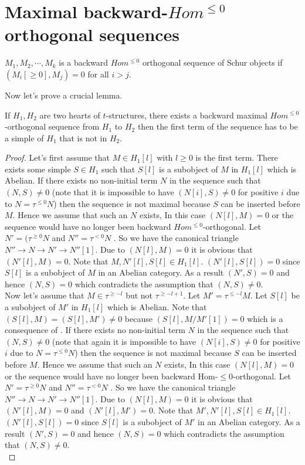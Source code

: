\section{Maximal backward-$Hom^{\leq 0}$ orthogonal sequences}
\begin{definition}
$M_1,M_2,\cdots, M_k$ is a backward $Hom^{\leq 0}$ orthogonal sequence of Schur objects if $(M_i[\geq 0], M_j) = 0$ for all $i>j$.
\end{definition}
\indent Now let's prove a crucial lemma.\\
\begin{lemma}\label{lem:C3L1}
If $H_1, H_2$ are two hearts of $t$-structures, there exists a backward maximal $Hom^{\leq 0}$-orthogonal sequence from $H_1$ to $H_2$ then the first term of the sequence has to be a simple of $H_1$ that is not in $H_2$.
\end{lemma}
\begin{proof}
\indent Let's first assume that $M\in H_1[l]$ with $l\geq 0$ is the first term. There exists some simple $S\in H_1$ such that $S[l]$ is a subobject of $M$ in $H_1[l]$ which is Abelian. If there exists no non-initial term $N$ in the sequence such that $(N,S) \neq 0$ (note that it is impossible to have $(N[i],S)\neq 0$ for positive $i$ due to $N=\tau^{\leq 0}N$) then the sequence is not maximal because $S$ can be inserted before $M$. Hence we assume that such an $N$ exists, In this case $(N[l],M)= 0$ or the sequence would have no longer been backward $Hom^{\leq 0}$-orthogonal. Let $N' = (\tau^{\geq 0}N$ and $N'' = \tau^{<0} N$ . So we have the canonical triangle $N''\to N\to N'\to N''[1]$. Due to $(N[l],M) = 0$ it is obvious that $(N'[l],M) = 0$. Note that $M, N'[l], S[l]\in H_1[l]$. $(N'[l],S[l]) = 0$ since $S[l]$ is a subobject of $M$ in an Abelian category. As a result $(N',S) = 0$ and hence $(N,S) = 0$ which contradicts the assumption that $(N,S)\neq 0$.\\
\indent Now let's assume that $M\in \tau^{\geq -l}$ but not $\tau^{\geq -l+1}$. Let $M' = \tau^{\leq -l}M$. Let $S[l]$ be a subobject of $M'$ in $H_1[l]$ which is Abelian. Note that $(S[l],M) = (S[l],M')\neq 0$ because $(S[l], M/M'[1]) = 0$ which is a consequence of . If there exists no non-initial term $N$ in the sequence such that $(N,S) \neq 0$ (note that again it is impossible to have $(N[i],S)\neq 0$ for positive $i$ due to $N=\tau^{\leq 0}N$) then the sequence is not maximal because $S$ can be inserted before $M$. Hence we assume that such an $N$ exists, In this case $(N[l],M)= 0$ or the sequence would have no longer been backward Hom-$\leq 0$-orthogonal. Let $N' = \tau^{\geq 0}N$ and $N'' = \tau^{<0} N$ . So we have the canonical triangle $N''\to N\to N'\to N''[1]$. Due to $(N[l],M) = 0$ it is obvious that $(N'[l],M) = 0$ and $(N'[l],M')=0$. Note that $M', N'[l], S[l]\in H_1[l]$. $(N'[l],S[l]) = 0$ since $S[l]$ is a subobject of $M'$ in an Abelian category. As a result $(N',S) = 0$ and hence $(N,S) = 0$ which contradicts the assumption that $(N,S)\neq 0$.\\
\end{proof}
